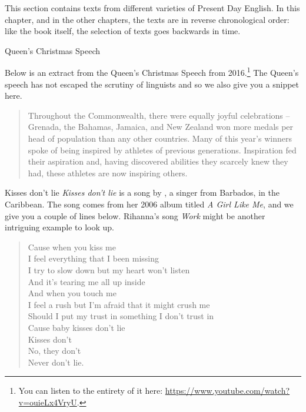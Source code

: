 This section contains texts from different varieties of Present Day English. In this chapter, and in the other chapters, the texts are in reverse chronological order: like the book itself, the selection of texts goes backwards in time.

\begin{texts}{Queen's Christmas Speech}
\label{text-samples}


Below is an extract from the Queen's Christmas Speech from 2016.\footnote{You can listen to the entirety of it here: \url{https://www.youtube.com/watch?v=ouieLx4VryU}.} The Queen's speech has not escaped the scrutiny of linguists and so we also give you a snippet here.

\begin{quote}
    \internallinenumbers*{}
    Throughout the Commonwealth, there were equally joyful celebrations -- Grenada, the Bahamas, Jamaica, and New Zealand won more medals per head of population than any other countries. Many of this year's winners spoke of being inspired by athletes of previous generations. Inspiration fed their aspiration and, having discovered abilities they scarcely knew they had, these athletes are now inspiring others.
\end{quote}
\end{texts}

\begin{texts}{Kisses don't lie}
\emph{Kisses don't lie} is a song by , a singer from Barbados, in the Caribbean. The song comes from her 2006 album titled \textit{A Girl Like Me}, and we give you a couple of lines below. Rihanna's song \emph{Work} might be another intriguing example to look up.

\begin{verse}
Cause when you kiss me\\
I feel everything that I been missing\\
I try to slow down but my heart won't listen\\
And it's tearing me all up inside\\
And when you touch me\\
I feel a rush but I'm afraid that it might crush me\\
Should I put my trust in something I don't trust in\\
Cause baby kisses don't lie\\
Kisses don't\\
No, they don't\\
Never don't lie.\\
\end{verse}

\end{texts}

